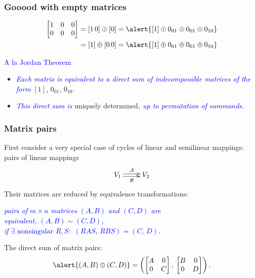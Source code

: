 \documentclass[usenames,dvipsnames]{beamer}
\begin{document}
\begin{frame}
\frametitle{ \alert{Gooood}
with empty
matrices} \vspace{-1cm}
\begin{align*}
\begin{bmatrix}
  1&0&0 \\0&0&0\\
\end{bmatrix}&=
[1\,0]\oplus [0]
=
\alert{[1]\oplus 0_{01} \oplus
0_{01}\oplus 0_{10}}
\\
&=
[1]\oplus [0\, 0]=
\alert{[1]\oplus 0_{01} \oplus
0_{01}\oplus 0_{10}}
\end{align*}
\bigskip

\textcolor{blue}{\large A la Jordan
Theorem}
\begin{itemize}
  \item \textcolor{blue}{\it Each
      matrix is equivalent to a
      direct sum of indecomposable
      matrices of the form}
      \alert{$[1]$, $0_{01}$,
      $0_{10}$}.

  \item \textcolor{blue}{\it This
      direct sum is}
      \alert{uniquely
      determined}\textcolor{blue}{\it,
      up to permutation of
      summands.}
\end{itemize}
  \end{frame}

\begin{frame}
\frametitle{Matrix pairs}

First consider a very special case of
cycles of linear and semilinear
mappings: \alert{pairs of linear
mappings}
\[
  \xymatrix{
 {V_1}
 \ar@<0.4ex>[r]^{\cal A}
 \ar@<-0.4ex>[r]_{\cal B}
 &{V_2}}
\]
Their matrices are reduced by
equivalence transformations:
\begin{center}\textcolor{blue}{\it
pairs of $m\times n$
      matrices $(A,B)$ and $(C,D)$
      are \\\alert{equivalent},\quad
      \alert{$(A,B)\sim(C,D)$},\\
 if
$\exists \text{ nonsingular } R,S:$
$(RAS,\,RBS)=(C,\,D). $}
\end{center}



The \alert{direct sum} of
      matrix pairs: \[
      \alert{(A,B)\oplus(C,D)}=\left(\begin{bmatrix}
  A & 0 \\
  0 & C
\end{bmatrix},\: \begin{bmatrix}
  B & 0 \\
  0 & D
\end{bmatrix}\right).
\]
  \end{frame}
\end{document}
